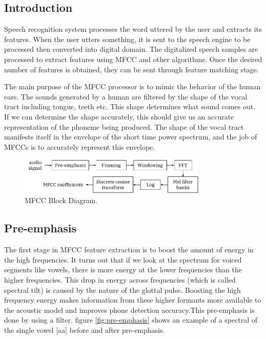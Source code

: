 \documentclass[12pt, a4paper, twoside]{report}
\begin{document}
\subsection{Introduction}
Speech recognition system processes the word uttered by the user and extracts its features. When the user utters something, it is sent to the speech engine to be processed then converted into digital domain. The digitalized speech samples are processed to extract features using MFCC and other algorithms. Once the desired number of features is obtained, they can be sent through feature matching stage.
\par
The main purpose of the MFCC processor is to mimic the behavior of the human ears. The sounds generated by a human are filtered by the shape of the vocal tract including tongue, teeth etc. This shape determines what sound comes out. If we can determine the shape accurately, this should give us an accurate representation of the phoneme being produced. The shape of the vocal tract manifests itself in the envelope of the short time power spectrum, and the job of MFCCs is to accurately represent this envelope.
\begin{figure}[!h]
	\centering
	\includegraphics[width=0.8\textwidth]
	{images/chapter3/mfcc}
	\caption{MFCC Block Diagram.}
	\label{fig:mfcc}
\end{figure}

\subsection{Pre-emphasis}
The first stage in MFCC feature extraction is to boost the amount of energy in the high frequencies. It turns out that if we look at the spectrum for voiced segments like vowels, there is more energy at the lower frequencies than the higher frequencies. This drop in energy across frequencies (which is called spectral tilt) is caused by the nature of the glottal pulse. Boosting the high frequency energy makes information from these higher formants more available to the acoustic model and improves phone detection accuracy.This pre-emphasis is done by using a filter. figure \ref{fig:pre-emphasis} shows an example of a spectral of the single vowel [aa] before and after pre-emphasis.
\end{document}
